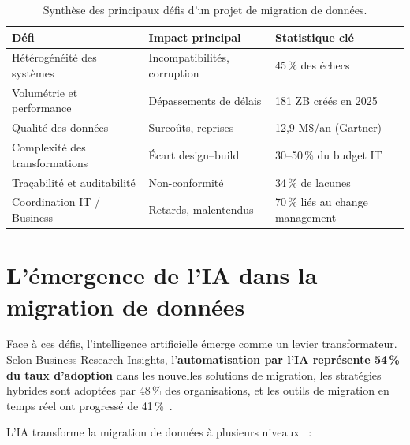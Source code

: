 \begin{table}[H]
\centering
\caption{Synthèse des principaux défis d'un projet de migration de données.}
\label{tab:defis_migration}
\begin{tabular}{lll}
\hline
\textbf{Défi} & \textbf{Impact principal} & \textbf{Statistique clé} \\
\hline
Hétérogénéité des systèmes    & Incompatibilités, corruption   & 45\,\% des échecs \\
Volumétrie et performance     & Dépassements de délais         & 181 ZB créés en 2025 \\
Qualité des données           & Surcoûts, reprises             & 12,9 M\$/an (Gartner) \\
Complexité des transformations & Écart design--build           & 30--50\,\% du budget IT \\
Traçabilité et auditabilité   & Non-conformité                 & 34\,\% de lacunes \\
Coordination IT / Business    & Retards, malentendus           & 70\,\% liés au change management \\
\hline
\end{tabular}
\end{table}

\section{L'émergence de l'IA dans la migration de données}

Face à ces défis, l'intelligence artificielle émerge comme un levier
transformateur. Selon Business Research Insights, l'\textbf{automatisation
par l'IA représente 54\,\% du taux d'adoption} dans les nouvelles solutions
de migration, les stratégies hybrides sont adoptées par 48\,\% des
organisations, et les outils de migration en temps réel ont progressé de
41\,\%~\cite{bri2026}.

L'IA transforme la migration de données à plusieurs niveaux~\cite{buzzclan2026,
ispirer_ai} :

